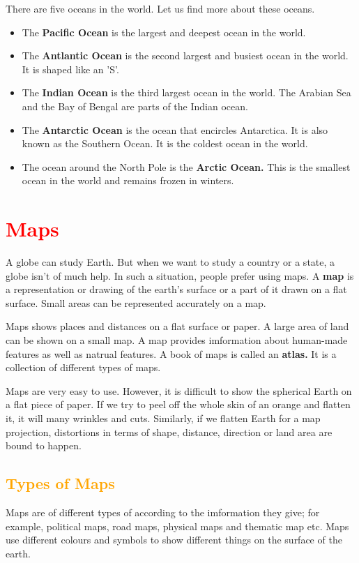 There are five oceans in the world. Let us find more about these oceans.
\begin{itemize}
    \item The \textbf{Pacific Ocean} is the largest and deepest ocean in the world.
    \item The \textbf{Antlantic Ocean} is the second largest and busiest ocean in the world. It is shaped like an 'S'.
    \item The \textbf{Indian Ocean} is the third largest ocean in the world. The Arabian Sea and the Bay of Bengal are parts of the Indian ocean.
    \item The \textbf{Antarctic Ocean} is the ocean that encircles Antarctica. It is also known as the Southern Ocean. It is the coldest ocean in the world.
    \item The ocean around the North Pole is the \textbf{Arctic Ocean.} This is the smallest ocean in the world and remains frozen in winters.
\end{itemize}
\vspace{0.26in}
\section{\textcolor{red}{Maps}}
A globe can study Earth. But when we want to study a country or a state, a globe isn't of much help. In such a situation, people prefer using maps. A \textbf{map} is a representation or drawing of the earth's surface or a part of it drawn on a flat surface. Small areas can be represented accurately on a map.
\vspace{0.1in}
\par
Maps shows places and distances on a flat surface or paper. A large area of land can be shown on a small map. A map provides imformation about human-made features as well as natrual features. A book of maps is called an \textbf{atlas.} It is a collection of different types of maps.
\vspace{0.1in}
\par
Maps are very easy to use. However, it is difficult to show the spherical Earth on a flat piece of paper. If we try to peel off the whole skin of an orange and flatten it, it will many wrinkles and cuts. Similarly, if we flatten Earth for a map projection, distortions in terms of shape, distance, direction or land area are bound to happen.
\subsection{\textcolor{orange}{Types of Maps}}
Maps are of different types of according to the imformation they give; for example, political maps, road maps, physical maps and thematic map etc. Maps use different colours and symbols to show different things on the surface of the earth.
